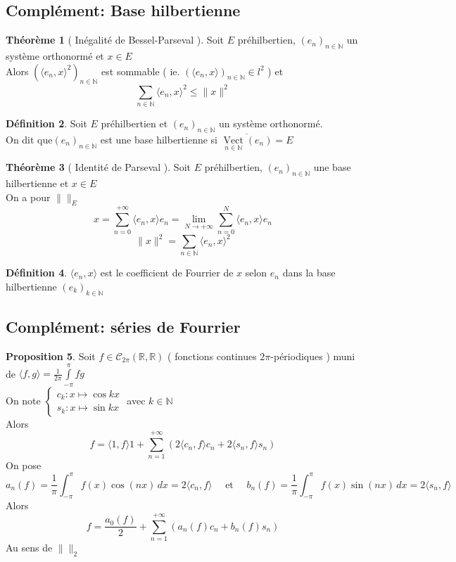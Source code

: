 \documentclass[10pt,a4paper]{article}
\theoremstyle{definition}
\newtheorem{proposition}{Proposition}[section]
\newtheorem{theorem}[proposition]{Théorème}
\newtheorem{definition}[proposition]{Définition}
\DeclareMathOperator*{\vect}{Vect}
\begin{document}
\subsection{Complément: Base hilbertienne}
\begin{theorem}[ Inégalité de Bessel-Parseval ]
    Soit \(E\) préhilbertien, \((e_n)_{n \in \mathbb{N}}\) un système orthonormé et \(x \in E\) \\
    Alors \(\left( \langle e_n, x \rangle^2 \right)_{n \in \mathbb{N}}\) est sommable ( ie. \(\left(\langle e_n, x \rangle \right)_{n \in \mathbb{N}} \in l^2\) ) et
    \[\sum_{n \in \mathbb{N}} \langle e_n, x \rangle^2 \leq \lVert x \rVert^2\]
\end{theorem}
\begin{definition}
    Soit \(E\) préhilbertien et \((e_n)_{n \in \mathbb{N}}\) un système orthonormé. \\
    On dit que\((e_n)_{n \in \mathbb{N}}\) est une base hilbertienne si \(\overline{\vect\limits_{n \in \mathbb{N}}(e_n)} = E\)
\end{definition}
\begin{theorem}[ Identité de Parseval ]
    Soit \(E\) préhilbertien, \((e_n)_{n \in \mathbb{N}}\) une base hilbertienne et \(x \in E\) \\
    On a pour \(\lVert \rVert_E\) \[x = \sum_{n = 0}^{+\infty} \langle e_n, x \rangle e_n = \lim_{N \to +\infty} \sum_{n = 0}^{N} \langle e_n, x \rangle e_n\]
    \[\boxed{\lVert x \rVert^2 = \sum_{n \in \mathbb{N}} \langle e_n, x \rangle^2}\]
\end{theorem}
\begin{definition}
    \(\langle e_n, x \rangle\) est le coefficient de Fourrier de \(x\) selon \(e_n\) dans la base hilbertienne \((e_k)_{k \in \mathbb{N}}\)
\end{definition}

\subsection{Complément: séries de Fourrier}
\begin{proposition}
    Soit \(f \in \mathcal{C}_{2\pi}(\mathbb{R}, \mathbb{R})\) ( fonctions continues \(2\pi\)-périodiques ) muni de \(\langle f, g \rangle = \frac{1}{2\pi}\int\limits_{-\pi}^{\pi}fg\) \\
    On note \(\begin{cases} c_k : x \mapsto \cos kx \\ s_k : x \mapsto \sin kx \end{cases}\) avec \(k \in \mathbb{N}\) \\
    Alors \[f = \langle 1, f \rangle 1 + \sum_{n = 1}^{+\infty} \left(2 \langle c_n, f \rangle c_n + 2 \langle s_n, f \rangle s_n \right)\]
    On pose \[a_n(f) = \frac{1}{\pi}\int_{-\pi}^{\pi}f(x)\cos(nx) \,dx = 2 \langle c_n, f \rangle \quad \text{ et } \quad b_n(f) = \frac{1}{\pi}\int_{-\pi}^{\pi}f(x)\sin(nx) \,dx = 2 \langle s_n, f \rangle\]
    Alors \[\boxed{f = \frac{a_0(f)}{2} + \sum_{n = 1}^{+\infty}\left(a_n(f) c_n + b_n(f) s_n\right)}\]
    Au sens de \(\lVert \rVert_2\)
\end{proposition}
\end{document}
